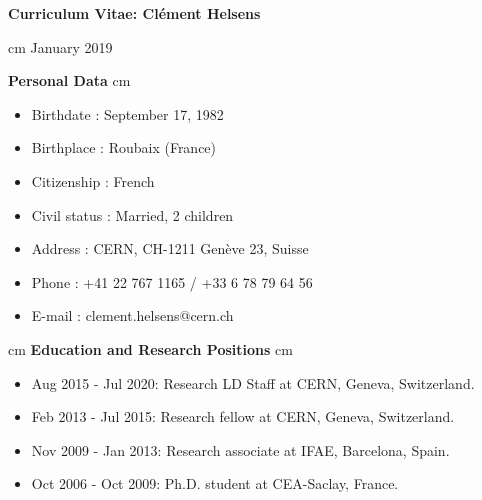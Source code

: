 \documentclass[12pt]{article}
\begin{document}
\pagestyle{fancy}
\fancyhf{}


\begin{center}
\vskip 1cm
{\bf \Large Curriculum Vitae: Cl\'ement Helsens} \\
\end{center}
\vskip 0.5cm
 cm January 2019
\vskip 1.8cm

{\bf \large Personal Data}
 cm
\TabPositions{2.5cm}
\begin{itemize}
\itemsep0em
\item[] Birthdate  \tab : September 17, 1982
\item[] Birthplace \tab :   Roubaix (France) 
\item[] Citizenship \tab :  French
\item[] Civil status \tab : Married, 2 children
\item[] Address \tab : CERN, CH-1211 Gen\`eve 23, Suisse
\item[] Phone \tab : +41 22 767 1165  / +33 6 78 79 64 56
\item[] E-mail \tab : clement.helsens@cern.ch
\end{itemize}


 cm
{\bf \large Education and Research Positions}
 cm
\TabPositions{2.5cm}
\begin{itemize}
\itemsep0em
\item[] Aug 2015 - Jul 2020: Research LD Staff at CERN, Geneva, Switzerland.
\item[] Feb 2013 - Jul 2015: Research fellow at CERN, Geneva, Switzerland.
\item[] Nov 2009 - Jan 2013: Research associate at IFAE, Barcelona, Spain.
\item[] Oct 2006 - Oct 2009: Ph.D. student at CEA-Saclay, France.
\end{itemize}
\end{document}
